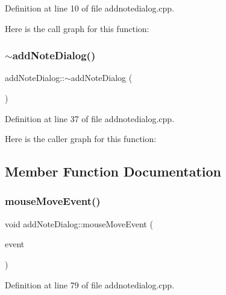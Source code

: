 Definition at line 10 of file addnotedialog.\+cpp.

Here is the call graph for this function\+:
\hypertarget{classaddNoteDialog_a900c8ab72a54252fa03299d821af644f}{}\label{classaddNoteDialog_a900c8ab72a54252fa03299d821af644f} 
\subsubsection{\texorpdfstring{$\sim$add\+Note\+Dialog()}{~addNoteDialog()}}
{\footnotesize\ttfamily add\+Note\+Dialog\+::$\sim$add\+Note\+Dialog (\begin{DoxyParamCaption}{ }\end{DoxyParamCaption})}



Definition at line 37 of file addnotedialog.\+cpp.

Here is the caller graph for this function\+:


\subsection{Member Function Documentation}
\hypertarget{classaddNoteDialog_a56670c6227c03bc1277f22789e7876e4}{}\label{classaddNoteDialog_a56670c6227c03bc1277f22789e7876e4} 
\subsubsection{\texorpdfstring{mouse\+Move\+Event()}{mouseMoveEvent()}}
{\footnotesize\ttfamily void add\+Note\+Dialog\+::mouse\+Move\+Event (\begin{DoxyParamCaption}\item[{Q\+Mouse\+Event $\ast$}]{event }\end{DoxyParamCaption})\hspace{0.3cm}{\ttfamily [private]}}



Definition at line 79 of file addnotedialog.\+cpp.

\hypertarget{classaddNoteDialog_a5479e71fa86229b5d3a2e03ffd3ddbeb}{}\label{classaddNoteDialog_a5479e71fa86229b5d3a2e03ffd3ddbeb} 
